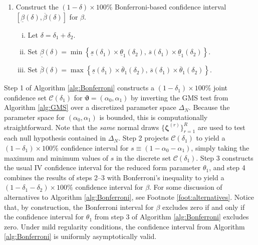 \begin{alg}
\begin{enumerate}
\begin{enumerate}[(i)]
      \end{enumerate}
    \item Construct the $(1 - \delta)\times 100\%$ Bonferroni-based confidence interval $\left[ \underline{\beta}(\delta), \overline{\beta}(\delta) \right]$ for $\beta$.
      \begin{enumerate}[(i)]
        \item Let $\delta = \delta_1 + \delta_2$.
        \item Set $\underline{\beta}(\delta) = \min \left\{ \underline{s}(\delta_1)\times \underline{\theta}_1(\delta_2),\, \overline{s}(\delta_1)\times \underline{\theta}_1(\delta_2) \right\}$.
        \item Set $\overline{\beta}(\delta) = \max \left\{ \underline{s}(\delta_1)\times \overline{\theta}_1(\delta_2),\, \overline{s}(\delta_1)\times \overline{\theta}_1(\delta_2) \right\}$.
      \end{enumerate}
  \end{enumerate}
  \label{alg:Bonferroni}
\end{alg}

Step 1 of Algorithm \ref{alg:Bonferroni} constructs a $(1 - \delta_1)\times 100\%$ joint confidence set $\mathcal{C}(\delta_1)$ for $\boldsymbol{\vartheta} = (\alpha_0, \alpha_1)$ by inverting the GMS test from Algorithm \ref{alg:GMS} over a discretized parameter space $\Delta_N$.
Because the parameter space for $(\alpha_0, \alpha_1)$ is bounded, this is computationally straightforward.
Note that the \emph{same} normal draws $\{\boldsymbol{\zeta}^{(r)}\}_{r=1}^R$ are used to test each null hypothesis contained in $\Delta_N$.
Step 2 projects $\mathcal{C}(\delta_1)$ to yield a $(1 - \delta_1)\times 100\%$ confidence interval for $s \equiv (1 - \alpha_0 - \alpha_1)$, simply taking the maximum and minimum values of $s$ in the discrete set  $\mathcal{C}(\delta_1)$.
Step 3 constructs the usual IV confidence interval for the reduced form parameter $\theta_1$, and step 4 combines the results of steps 2--3 with Bonferroni's inequality to yield a $(1 - \delta_1 - \delta_2) \times 100\%$ confidence interval for $\beta$.
For some discussion of alternatives to Algorithm \ref{alg:Bonferroni}, see Footnote \ref{foot:alternatives}.
Notice that, by construction, the Bonferroni interval for $\beta$ excludes zero if and only if the confidence interval for $\theta_1$ from step 3 of Algorithm \ref{alg:Bonferroni} excludes zero.
Under mild regularity conditions, the confidence interval from Algorithm \ref{alg:Bonferroni} is uniformly asymptotically valid.

